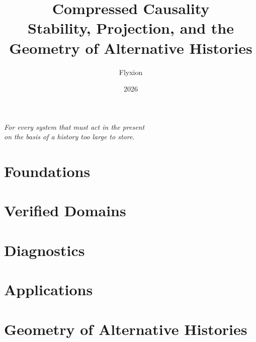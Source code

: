 \documentclass[11pt, oneside, openany]{book}
\title{\textbf{Compressed Causality}\\[0.5em]
  \large Stability, Projection, and the Geometry of Alternative Histories}
\author{Flyxion}
\date{2026}
\theoremstyle{definition}
\theoremstyle{remark}
\begin{document}
\frontmatter

\maketitle
\thispagestyle{empty}

\vspace*{\fill}
\begin{center}
\textit{For every system that must act in the present\\
on the basis of a history too large to store.}
\end{center}
\vspace*{\fill}
\clearpage




\tableofcontents

\mainmatter

\part{Foundations}





\part{Verified Domains}




\part{Diagnostics}




\part{Applications}




\part{Geometry of Alternative Histories}




\appendix


\backmatter




\printindex
\end{document}
